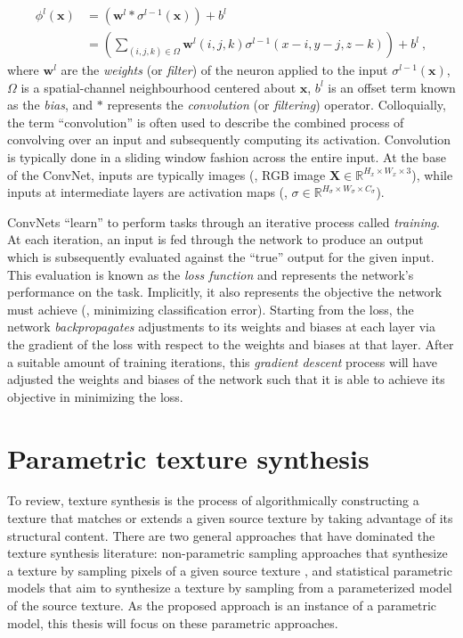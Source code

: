 \begin{equation}
	\begin{aligned}
		\phi^l(\mathbf{x}) &= \left(\mathbf{w}^l * \sigma^{l-1}(\mathbf{x})\right) + b^l\\
		&= \left(\sum_{(i, j, k) \in \Omega} \mathbf{w}^l(i, j, k) \sigma^{l-1}(x - i, y - j, z - k)\right) + b^l\ ,
	\end{aligned}
\end{equation}
where $\mathbf{w}^l$ are the \emph{weights} (or \emph{filter}) of the neuron applied to the input $\sigma^{l-1}(\mathbf{x})$, $\Omega$ is a spatial-channel neighbourhood centered about $\mathbf{x}$, $b^l$ is an offset term known as the \emph{bias}, and $\ast$ represents the \emph{convolution} (or \emph{filtering}) operator. Colloquially, the term ``convolution'' is often used to describe the combined process of convolving over an input and subsequently computing its activation. Convolution is typically done in a sliding window fashion across the entire input. At the base of the ConvNet, inputs are typically images (\eg, RGB image $\mathbf{X} \in \mathbb{R}^{H_x \times W_x \times 3}$), while inputs at intermediate layers are activation maps (\eg, $\sigma \in \mathbb{R}^{H_\sigma \times W_\sigma \times C_\sigma}$). 

ConvNets ``learn'' to perform tasks through an iterative process called \emph{training}. At each iteration, an input is fed through the network to produce an output which is subsequently evaluated against the ``true'' output for the given input. This evaluation is known as the \emph{loss function} and represents the network's performance on the task. Implicitly, it also represents the objective the network must achieve (\eg, minimizing classification error). Starting from the loss, the network \emph{backpropagates} adjustments to its weights and biases at each layer via the gradient of the loss with respect to the weights and biases at that layer. After a suitable amount of training iterations, this \emph{gradient descent} process will have adjusted the weights and biases of the network such that it is able to achieve its objective in minimizing the loss.

\section{Parametric texture synthesis}

To review, texture synthesis is the process of algorithmically constructing a texture that
matches or extends a given source texture by taking advantage of its structural 
content. There are two general approaches that have dominated the texture
synthesis literature: non-parametric sampling approaches that
synthesize a texture by sampling pixels of a given source texture
\cite{efros1999,kwatra2003graphcut,schodl2000,wei2000}, and 
statistical parametric models that aim to synthesize a texture by sampling
from a parameterized model of the source texture.
As the proposed approach is an instance of a parametric model, this thesis 
will focus on these parametric approaches.

